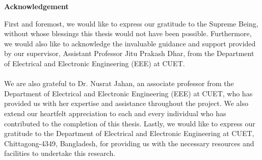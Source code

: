 \begin{center}
    \Large{\textbf{Acknowledgement}}
\end{center}
\vspace{1cm}
First and foremost, we would like to express our gratitude to the Supreme Being, without whose blessings this thesis would not have been possible. Furthermore, we would also like to acknowledge the invaluable guidance and support provided by our supervisor, Assistant Professor Jitu Prakash Dhar, from the Department of Electrical and Electronic Engineering (EEE) at CUET.
\\
\\
We are also grateful to Dr. Nusrat Jahan, an associate professor from the Department of Electrical and Electronic Engineering (EEE) at CUET, who has provided us with her expertise and assistance throughout the project. We also extend our heartfelt appreciation to each and every individual who has contributed to the completion of this thesis. Lastly, we would like to express our gratitude to the Department of Electrical and Electronic Engineering at CUET, Chittagong-4349, Bangladesh, for providing us with the necessary resources and facilities to undertake this research.
\newpage